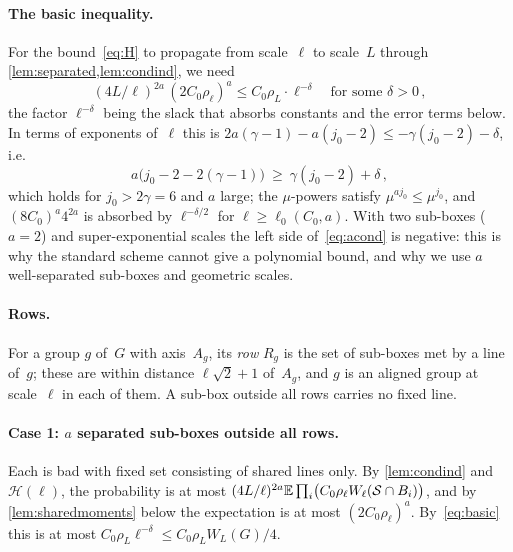 \documentclass[11pt,letterpaper]{article}
\begin{document}
\paragraph{The basic inequality.} For the bound~\eqref{eq:H} to propagate from scale~$\ell$ to scale~$L$ through \cref{lem:separated,lem:condind}, we need
\begin{equation}
\label{eq:basic}
  (4L/\ell)^{2a}\,(2C_0\rho_\ell)^a\le C_0\rho_L\cdot\ell^{-\delta}\quad\text{for some }\delta>0\,,
\end{equation}
the factor $\ell^{-\delta}$ being the slack that absorbs constants and the error terms below. In terms of exponents of~$\ell$ this is $2a(\gamma-1)-a(j_0-2)\le-\gamma(j_0-2)-\delta$, i.e.
\begin{equation}
\label{eq:acond}
  a\bigl(j_0-2-2(\gamma-1)\bigr)\ \ge\ \gamma(j_0-2)+\delta\,,
\end{equation}
which holds for $j_0>2\gamma=6$ and $a$ large; the $\mu$-powers satisfy $\mu^{aj_0}\le\mu^{j_0}$, and $(8C_0)^a4^{2a}$ is absorbed by $\ell^{-\delta/2}$ for $\ell\ge\ell_0(C_0,a)$. With two sub-boxes ($a=2$) and super-exponential scales the left side of~\eqref{eq:acond} is negative: this is why the standard scheme cannot give a polynomial bound, and why we use $a$ well-separated sub-boxes and geometric scales.

\paragraph{Rows.} For a group $g$ of~$G$ with axis~$A_g$, its \emph{row} $R_g$ is the set of sub-boxes met by a line of~$g$; these are within distance $\ell\sqrt2+1$ of~$A_g$, and $g$ is an aligned group at scale~$\ell$ in each of them. A sub-box outside all rows carries no fixed line.

\paragraph{Case 1: $a$ separated sub-boxes outside all rows.} Each is bad with fixed set consisting of shared lines only. By \cref{lem:condind} and $\mathcal H(\ell)$, the probability is at most $(4L/\ell)^{2a}\mathbb E\prod_i\bigl(C_0\rho_\ell W_\ell(\mathcal S\cap B_i)\bigr)$, and by \cref{lem:sharedmoments} below the expectation is at most $(2C_0\rho_\ell)^a$. By~\eqref{eq:basic} this is at most $C_0\rho_L\ell^{-\delta}\le C_0\rho_LW_L(G)/4$.
\end{document}
